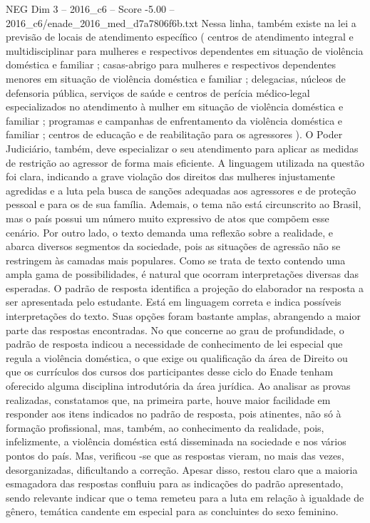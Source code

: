\begin{textsample}{NEG Dim 3 – 2016\_c6 – Score -5.00 – 2016\_c6/enade\_2016\_med\_d7a7806f6b.txt}
Nessa linha, também existe na lei a previsão de locais de atendimento específico ( centros de atendimento integral e multidisciplinar para mulheres e respectivos dependentes em situação de violência doméstica e familiar ; casas-abrigo para mulheres e respectivos dependentes menores em situação de violência doméstica e familiar ; delegacias, núcleos de defensoria pública, serviços de saúde e centros de perícia médico-legal especializados no atendimento à mulher em situação de violência doméstica e familiar ; programas e campanhas de enfrentamento da violência doméstica e familiar ; centros de educação e de reabilitação para os agressores ).
O Poder Judiciário, também, deve especializar o seu atendimento para aplicar as medidas de restrição ao agressor de forma mais eficiente.
A linguagem utilizada na questão foi clara, indicando a grave violação dos direitos das mulheres injustamente agredidas e a luta pela busca de sanções adequadas aos agressores e de proteção pessoal e para os de sua família.
Ademais, o tema não está circunscrito ao Brasil, mas o país possui um número muito expressivo de atos que compõem esse cenário.
Por outro lado, o texto demanda uma reflexão sobre a realidade, e abarca diversos segmentos da sociedade, pois as situações de agressão não se restringem às camadas mais populares.
Como se trata de texto contendo uma ampla gama de possibilidades, é natural que ocorram interpretações diversas das esperadas.
O padrão de resposta identifica a projeção do elaborador na resposta a ser apresentada pelo estudante.
Está em linguagem correta e indica possíveis interpretações do texto.
Suas opções foram bastante amplas, abrangendo a maior parte das respostas encontradas.
No que concerne ao grau de profundidade, o padrão de resposta indicou a necessidade de conhecimento de lei especial que regula a violência doméstica, o que exige ou qualificação da área de Direito ou que os currículos dos cursos dos participantes desse ciclo do Enade tenham oferecido alguma disciplina introdutória da área jurídica.
Ao analisar as provas realizadas, constatamos que, na primeira parte, houve maior facilidade em responder aos itens indicados no padrão de resposta, pois atinentes, não só à formação profissional, mas, também, ao conhecimento da realidade, pois, infelizmente, a violência doméstica está disseminada na sociedade e nos vários pontos do país.
Mas, verificou -se que as respostas vieram, no mais das vezes, desorganizadas, dificultando a correção.
Apesar disso, restou claro que a maioria esmagadora das respostas confluiu para as indicações do padrão apresentado, sendo relevante indicar que o tema remeteu para a luta em relação à igualdade de gênero, temática candente em especial para as concluintes do sexo feminino.

\end{textsample}
